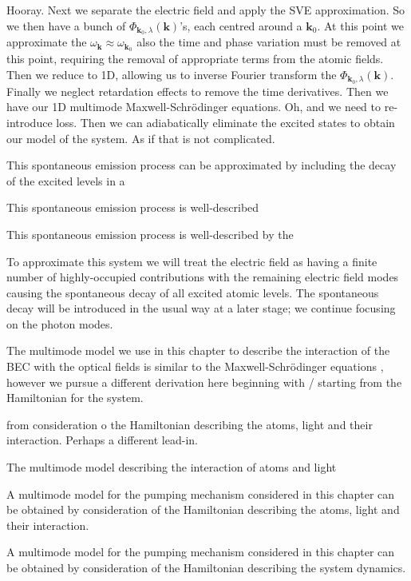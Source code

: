Hooray.  Next we separate the electric field and apply the SVE approximation. So we then have a bunch of $\Phi_{\bm{k}_0,\lambda}(\bm{k})$'s, each centred around a $\bm{k}_0$. At this point we approximate the $\omega_{\bm{k}}\approx \omega_{\bm{k}_0}$ also the time and phase variation must be removed at this point, requiring the removal of appropriate terms from the atomic fields.  Then we reduce to 1D, allowing us to inverse Fourier transform the $\Phi_{\bm{k}_0, \lambda}(\bm{k})$.  Finally we neglect retardation effects to remove the time derivatives.  Then we have our 1D multimode Maxwell-Schrödinger equations.  Oh, and we need to re-introduce loss.  Then we can adiabatically eliminate the excited states to obtain our model of the system.  As if that is not complicated.

This spontaneous emission process can be approximated by including the decay of the excited levels in a 

This spontaneous emission process is well-described


This spontaneous emission process is well-described by the 



To approximate this system we will treat the electric field as having a finite number of highly-occupied contributions with the remaining electric field modes causing the spontaneous decay of all excited atomic levels.  The spontaneous decay will be introduced in the usual way at a later stage; we continue focusing on the photon modes.



The multimode model we use in this chapter to describe the interaction of the BEC with the optical fields is similar to the Maxwell-Schrödinger equations \citep{Zobay:2005,Zobay:2006}, however we pursue a different derivation here beginning with / starting from the Hamiltonian for the system.


from consideration o the Hamiltonian describing the atoms, light and their interaction.  Perhaps a different lead-in.

The multimode model describing the interaction of atoms and light 


A multimode model for the pumping mechanism considered in this chapter can be obtained by consideration of the Hamiltonian describing the atoms, light and their interaction.




A multimode model for the pumping mechanism considered in this chapter can be obtained by consideration of the Hamiltonian describing the system dynamics.  




